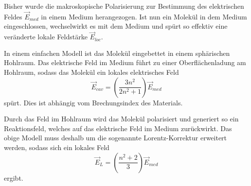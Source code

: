 Bisher wurde die makroskopische Polarisierung zur Bestimmung des elektrischen Feldes $\vec{E}_{med}$ in einem Medium herangezogen. Ist nun ein Molekül in dem Medium eingeschlossen, wechselwirkt es mit dem Medium und spürt so effektiv eine veränderte lokale Feldstärke $\vec{E}_{loc}$.

In einem einfachen Modell ist das Molekül eingebettet in einem sphärischen Hohlraum. Das elektrische Feld im Medium führt zu einer Oberflächenladung am Hohlraum, sodass das Molekül ein lokales elektrisches Feld
\begin{equation}
    \vec{E}_{cav} = \left(\frac{3n^{2}}{2n^{2}+1}\right) \vec{E}_{med}
\end{equation}
spürt. Dies ist abhängig vom Brechungsindex des Materials.

Durch das Feld im Hohlraum wird das Molekül polarisiert und generiert so ein Reaktionsfeld, welches auf das elektrische Feld im Medium zurückwirkt. Das obige Modell muss deshalb um die sogenannte Lorentz-Korrektur erweitert werden, sodass sich ein lokales Feld
\begin{equation}
    \vec{E}_{L} = \left(\frac{n^{2}+2}{3}\right) \vec{E}_{med}
\end{equation}
ergibt.



\printbibliography[segment=\therefsegment,heading=subbibliography]
